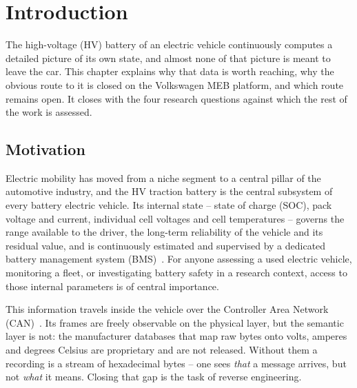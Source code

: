 \documentclass[11pt,a4paper,oneside,parskip=half]{scrreprt}
\begin{document}
\clearpage
{}
\setcounter{page}{1}


\chapter{Introduction}
The high-voltage (HV) battery of an electric vehicle continuously computes a detailed picture of its own state, and almost none of that picture is meant to leave the car. This chapter explains why that data is worth reaching, why the obvious route to it is closed on the Volkswagen MEB platform, and which route remains open. It closes with the four research questions against which the rest of the work is assessed.

\section{Motivation}
Electric mobility has moved from a niche segment to a central pillar of the automotive industry, and the HV traction battery is the central subsystem of every battery electric vehicle. Its internal state -- state of charge (SOC), pack voltage and current, individual cell voltages and cell temperatures -- governs the range available to the driver, the long-term reliability of the vehicle and its residual value, and is continuously estimated and supervised by a dedicated battery management system (BMS)~\cite{plett2015}. For anyone assessing a used electric vehicle, monitoring a fleet, or investigating battery safety in a research context, access to those internal parameters is of central importance.

This information travels inside the vehicle over the Controller Area Network (CAN)~\cite{iso11898}. Its frames are freely observable on the physical layer, but the semantic layer is not: the manufacturer databases that map raw bytes onto volts, amperes and degrees Celsius are proprietary and are not released. Without them a recording is a stream of hexadecimal bytes -- one sees \emph{that} a message arrives, but not \emph{what} it means. Closing that gap is the task of reverse engineering.
\end{document}
